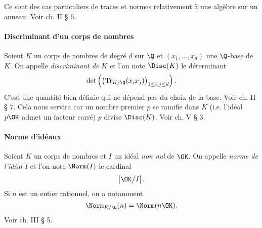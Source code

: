 	Ce sont des cas particuliers de traces et normes relativement à une algèbre sur un anneau. Voir \cite{Samuel} ch. II § 6.


\paragraph{Discriminant d'un corps de nombres} Soient $K$ un corps de nombres de degré $d$ sur $\Q$ et $(x_1, \dots, x_d)$ une $\Q$-base de $K$. On appelle \emph{discriminant de $K$} et l'on note $\Disc(K)$ le déterminant \[\det\left(\left(\mathrm{Tr}_{K/\Q}(x_i x_j)\right)_{1\leq i, j \leq d}\right).\] C'est une quantité bien définie qui ne dépend pas du choix de la base. Voir \cite{Samuel} ch. II § 7. Cela nous servira car un nombre premier $p$ se ramifie dans $K$ (i.e. l'idéal $p\OK$ admet un facteur carré) \ssi $p$ divise $\Disc(K)$. Voir \cite{Samuel} ch. V § 3.

\paragraph{Norme d'idéaux} Soient $K$ un corps de nombres et $I$ un idéal \emph{non nul} de $\OK$. On appelle \emph{norme de l'idéal $I$} et l'on note $\Norm(I)$ le cardinal \[\left|\OK\big/I\right|.\] Si $n$ est un entier rationnel, on a notamment \[\Norm_{K/\Q}(n) = \Norm(n\OK).\] Voir \cite{Samuel} ch. III § 5.
